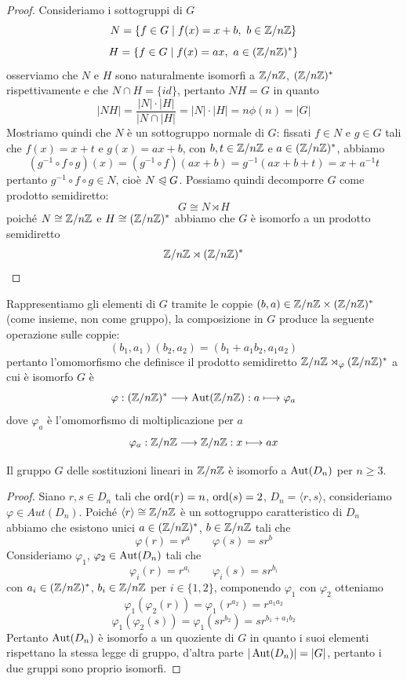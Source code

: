 \documentclass[11pt]{scrartcl}
\begin{document}
	\begin{proof}
		Consideriamo i sottogruppi di $G$
		\[
		N = \{f \in G\mid f(x) = x + b,~b \in {\mathbb Z}/n{\mathbb Z}\}
		\]
		\[
		H = \{f \in G\mid f(x) = ax,~a \in ({\mathbb Z}/n{\mathbb Z})^*\}
		\]
		osserviamo che $N$ e $H$ sono naturalmente isomorfi a ${\mathbb Z}/n{\mathbb Z}$, $({\mathbb Z}/n{\mathbb Z})^*$ 
		rispettivamente e che $N \cap H = \{id\}$, pertanto $NH = G$ in quanto 
		\[
		|NH| = \frac{|N|\cdot|H|}{|N\cap|H|} = |N|\cdot|H| = n\phi(n) = |G|
		\]
		Mostriamo quindi che $N$ è un sottogruppo normale di $G$: fissati $f \in N$
		e $g \in G$ tali che $f(x) = x + t$ e $g(x) = ax + b$, con $b, t \in {\mathbb Z}/n{\mathbb Z}$ e 
		$a \in ({\mathbb Z}/n{\mathbb Z})^*$, abbiamo
		\[
		(g^{-1}\circ f \circ g)(x) = (g^{-1}\circ f)(ax + b) = g^{-1}(ax + b + t) = 
		x + a^{-1}t
		\]
		pertanto $g^{-1}\circ f\circ g \in N$, cioè $N\trianglelefteqslant G$.
		Possiamo quindi decomporre $G$ come prodotto semidiretto:
		\[
		G \cong N\rtimes H
		\]
		poiché $N \cong {\mathbb Z}/n{\mathbb Z}$ e $H \cong ({\mathbb Z}/n{\mathbb Z})^*$ abbiamo che $G$ è isomorfo a un
		prodotto semidiretto 
		\[
		{\mathbb Z}/n{\mathbb Z} \rtimes ({\mathbb Z}/n{\mathbb Z})^*
		\]
	\end{proof}
	
	Rappresentiamo gli elementi di $G$ tramite le coppie $(b, a) \in {\mathbb Z}/n{\mathbb Z}\times ({\mathbb Z}/n{\mathbb Z})^*$
	(come insieme, non come gruppo),
	la composizione in $G$ produce la seguente operazione sulle coppie:
	\[
	(b_1, a_1)(b_2, a_2) = (b_1 + a_1b_2, a_1a_2)
	\]
	pertanto l'omomorfismo che definisce il prodotto semidiretto ${\mathbb Z}/n{\mathbb Z} \rtimes_{\varphi}({\mathbb Z}/n{\mathbb Z})^*$
	a cui è isomorfo $G$ è 
	\[
	\varphi: ({\mathbb Z}/n{\mathbb Z})^* \longrightarrow \operatorname{Aut}({\mathbb Z}/n{\mathbb Z}): a \longmapsto \varphi_a
	\]
	dove $\varphi_a$ è l'omomorfismo di moltiplicazione per $a$
	\[
	\varphi_a :{\mathbb Z}/n{\mathbb Z} \longrightarrow {\mathbb Z}/n{\mathbb Z}: x \longmapsto ax
	\]
	
	\begin{proposition}
		Il gruppo $G$ delle sostituzioni lineari in ${\mathbb Z}/n{\mathbb Z}$ è isomorfo a $\operatorname{Aut}(D_n)$
		per $n \geq 3$.
	\end{proposition}
	
	\begin{proof}
		Siano $r, s \in D_n$ tali che $\operatorname{ord}(r) = n$, $\operatorname{ord}(s) = 2$, $D_n = \langle r, s\rangle$,
		consideriamo $\varphi \in Aut(D_n)$. Poiché $\langle r\rangle \cong {\mathbb Z}/n{\mathbb Z}$ è un 
		sottogruppo caratteristico di $D_n$ abbiamo che esistono unici $a \in ({\mathbb Z}/n{\mathbb Z})^*$,
		$b \in {\mathbb Z}/n{\mathbb Z}$ tali che 
		\[
		\varphi(r) = r^a\qquad \varphi(s) = sr^b
		\]
		Consideriamo $\varphi_1$, $\varphi_2 \in \operatorname{Aut}(D_n)$ tali che
		\[
		\varphi_i(r) = r^{a_i} \qquad \varphi_i(s) = sr^{b_i}
		\]
		con $a_i \in ({\mathbb Z}/n{\mathbb Z})^*$, $b_i \in {\mathbb Z}/n{\mathbb Z}$ per $i \in \{1, 2\}$, componendo
		$\varphi_1$ con $\varphi_2$ otteniamo
		\[
		\varphi_1(\varphi_2(r)) = \varphi_1(r^{a_2}) = r^{a_1a_2}
		\]
		\[
		\varphi_1(\varphi_2(s)) = \varphi_1(sr^{b_2}) = sr^{b_1 + a_1b_2}
		\]
		Pertanto $\operatorname{Aut}(D_n)$ è isomorfo a un quoziente di $G$ in quanto i suoi
		elementi rispettano la stessa legge di gruppo, d'altra parte $|\operatorname{Aut}(D_n)| = |G|$,
		pertanto i due gruppi sono proprio isomorfi.
	\end{proof}
	
\end{document}
